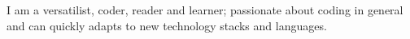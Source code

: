

\begin{cvparagraph}

I am a versatilist, coder, reader and learner; passionate about coding in general and can quickly adapts to new technology stacks and languages.
\end{cvparagraph}
